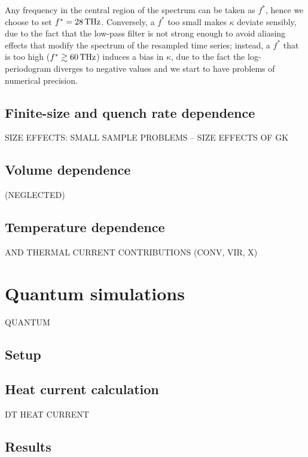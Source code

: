 Any frequency in the central region of the spectrum can be taken as $f^*$, hence we choose to set $f^*=28\,\mathrm{THz}$. Conversely, a $f^*$ too small makes $\kappa$ deviate sensibly, due to the fact that the low-pass filter is not strong enough to avoid aliasing effects that modify the spectrum of the resampled time series; instead, a $f^*$ that is too high ($f^*\gtrsim 60\,\mathrm{THz}$) induces a bias in $\kappa$, due to the fact the log-periodogram diverges to negative values and we start to have problems of numerical precision.


\subsection{Finite-size and quench rate dependence}  \label{sec:results-class-quench}
SIZE EFFECTS:  SMALL SAMPLE PROBLEMS -- SIZE EFFECTS OF GK

\subsection{Volume dependence}
(NEGLECTED)

\subsection{Temperature dependence}
AND THERMAL CURRENT CONTRIBUTIONS (CONV, VIR, X)


\section{Quantum simulations}
QUANTUM

\subsection{Setup}

\subsection{Heat current calculation}
DT HEAT CURRENT

\subsection{Results}

